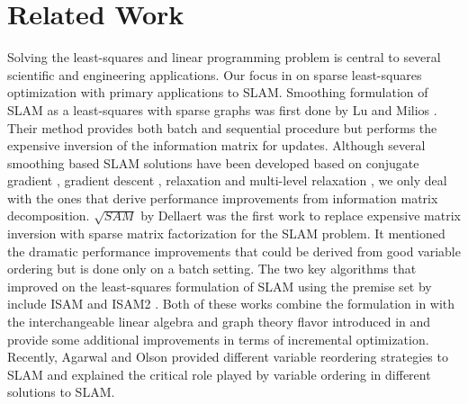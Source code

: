 \section{Related Work} 
Solving the least-squares and linear programming problem is central to several scientific  and engineering applications. Our focus in on sparse least-squares optimization with primary applications to SLAM. Smoothing formulation of SLAM as a least-squares with sparse graphs was first done by Lu and Milios \cite{lumiliosfirstgraphslam}. Their method provides both batch and sequential procedure but performs the expensive inversion of the information matrix for updates. Although several smoothing based SLAM solutions have been developed based on conjugate gradient \cite{cgdescent}, gradient descent \cite{gdescent}, relaxation \cite{thrunprobabilistic} and multi-level relaxation \cite{mlrelaxation}, we only deal with the ones that derive performance improvements from information matrix decomposition. $\sqrt{SAM}$ by Dellaert \cite{dellaertonlysam} was the first work to replace expensive matrix inversion with sparse matrix factorization for the SLAM problem. It mentioned the dramatic performance improvements that could be derived from good variable ordering but is done only on a batch setting. The two key algorithms that improved on the least-squares formulation of SLAM using the premise set by \cite{dellaertonlysam} include ISAM \cite{kaessisam} and ISAM2 \cite{kaessisam2}. Both of these works combine the formulation in \cite{lumiliosfirstgraphslam} with the interchangeable linear algebra and graph theory flavor introduced in \cite{dellaertonlysam} and provide some additional improvements in terms of incremental optimization. Recently, Agarwal and Olson \cite{variableorderingslam} provided different variable reordering strategies to SLAM and explained the critical role played by variable ordering in different solutions to SLAM. 
